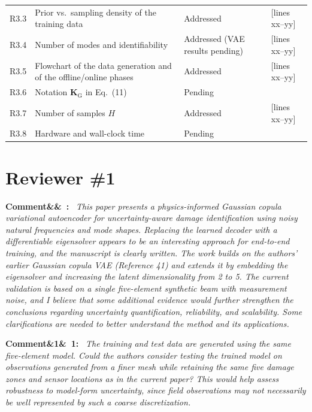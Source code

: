 \documentclass[11pt]{article}
\newenvironment{rcomment}[1]{\par\bigskip\noindent\textbf{Comment\ifx&#1&\else\ #1\fi:}\ \itshape}{\par}
\newcommand{\tbd}[1]{\textcolor{note}{\textsf{[#1]}}}
\newcommand{\lines}[1]{\tbd{lines #1}}
\begin{document}
{\begin{longtable}{p{1.55cm}p{6.0cm}p{3.0cm}p{3.6cm}}
R3.3 & Prior vs.\ sampling density of the training data & Addressed & \lines{xx--yy} \\
R3.4 & Number of modes and identifiability & Addressed (VAE results pending) & \lines{xx--yy} \\
R3.5 & Flowchart of the data generation and of the offline/online phases & Addressed & \lines{xx--yy} \\
R3.6 & Notation $\mathbf{K}_{\mathrm{G}}$ in Eq.~(11) & Pending & \\
R3.7 & Number of samples $H$ & Addressed & \lines{xx--yy} \\
R3.8 & Hardware and wall-clock time & Pending & \\
\bottomrule
\end{longtable}
}

\section{Reviewer \#1}

\begin{rcomment}{}
This paper presents a physics-informed Gaussian copula variational autoencoder for uncertainty-aware damage
identification using noisy natural frequencies and mode shapes. Replacing the learned decoder with a differentiable
eigensolver appears to be an interesting approach for end-to-end training, and the manuscript is clearly written. The work
builds on the authors' earlier Gaussian copula VAE (Reference 41) and extends it by embedding the eigensolver and
increasing the latent dimensionality from 2 to 5. The current validation is based on a single five-element synthetic
beam with measurement noise, and I believe that some additional evidence would further strengthen the conclusions
regarding uncertainty quantification, reliability, and scalability. Some clarifications are needed to better understand
the method and its applications.
\end{rcomment}

\begin{rcomment}{1}
The training and test data are generated using the same five-element model. Could the authors consider testing the trained model on observations generated from a finer mesh while retaining the same five damage zones and sensor locations as in the current paper? This would help assess robustness to model-form uncertainty, since field observations
may not necessarily be well represented by such a coarse discretization.
\end{rcomment}
\end{document}
